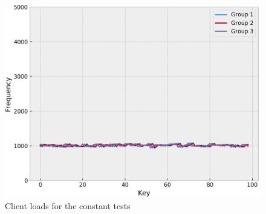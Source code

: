 \begin{figure}[!htb]
  \centering
  \includegraphics[width=\textwidth,height=\textheight,keepaspectratio]{img/clients_loads_constant.png}
  \caption{ Client loads for the constant tests }
  \label{fig:constant-skewed-loads}
\end{figure}




